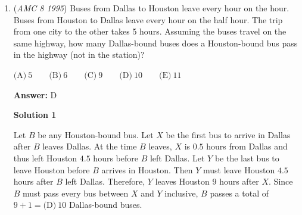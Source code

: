 \begin{enumerate}
$\text{(A)}\ 6.4 \qquad \text{(B)}\ 7 \qquad \text{(C)}\ 7.2 \qquad \text{(D)}\ 8 \qquad \text{(E)}\ 10$

 \textbf{Answer: }C



\textbf{Solution 1}

The area of $ABCD$ is $DC \cdot DE = 12 \cdot 6 = 72$.  Since $DE = 6$ and $AE = AB - BE = 12-4=8$, by the Pythagorean Theorem, $AD = \sqrt{6^2+8^2}=10$.  

 Since the area of $ABCD$ can also be written as $AD \cdot DF$, it follows that $10 \cdot DF = 72$, so $DF = \boxed{\textbf{(C)}\ 7.2}$.

 



\textbf{Solution 2}

Since $AE = 12 - 4 = 8$, by the Pythagorean theorem, $AD = \sqrt{6^2 + 8^2} = 10$.

 Since $\angle A = \angle C$ and $\angle DEA = \angle DFC = 90^{\circ}$, $\triangle DEA \sim \triangle DFC$.  

 Thus $\frac{DE}{DA} = \frac{DF}{DC}$, so $\frac{6}{10} = \frac{DF}{12}$ and thus $DF = \boxed{\textbf{(C)}\ 7.2}$

 -j314andrews

 


	\item (\textit{AMC 8 1995}) Buses from Dallas to Houston leave every hour on the hour.  Buses from Houston to Dallas leave every hour on the half hour.  The trip from one city to the other takes 5 hours.  Assuming the buses travel on the same highway, how many Dallas-bound buses does a Houston-bound bus pass in the highway (not in the station)?


 $\text{(A)}\ 5 \qquad \text{(B)}\ 6 \qquad \text{(C)}\ 9 \qquad \text{(D)}\ 10 \qquad \text{(E)}\ 11$

 \textbf{Answer: }D



\textbf{Solution 1}

Let $B$ be any Houston-bound bus.  Let $X$ be the first bus to arrive in Dallas after $B$ leaves Dallas.  At the time $B$ leaves, $X$ is $0.5$ hours from Dallas and thus left Houston $4.5$ hours before $B$ left Dallas.  Let $Y$ be the last bus to leave Houston before $B$ arrives in Houston.  Then $Y$ must leave Houston $4.5$ hours after $B$ left Dallas.  Therefore, $Y$ leaves Houston $9$ hours after $X$.  Since $B$ must pass every bus between $X$ and $Y$ inclusive, $B$ passes a total of $9 + 1 = \boxed{\text{(D)} \ 10}$ Dallas-bound buses.


\end{enumerate}
